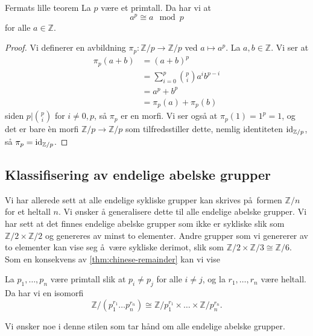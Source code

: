 \begin{corollary}{Fermats lille teorem}
    La $p$ være et primtall.
    Da har vi at
    \[
        a^p \cong a \mod p
    \]
    for alle $a\in \mathbb Z$.
\end{corollary}
\begin{proof}
    Vi definerer en avbildning $\pi_p\colon \mathbb Z / p\to\mathbb Z / p$
    ved $a\mapsto a^p$.
    La $a,b\in \mathbb Z$.
    Vi ser at
    \[\begin{aligned}
        \pi_p(a + b)
        &= (a + b)^p
        \\
        &= \sum_{i = 0}^p \binom p i a^i b^{p - i}
        \\
        &= a^p + b^p
        \\
        &= \pi_p(a) + \pi_p(b)
    \end{aligned}\]
    siden $p|\binom p i$ for $i\neq 0, p$,
    så $\pi_p$ er en morfi.
    Vi ser også at $\pi_p(1) = 1^p = 1$,
    og det er bare \`en morfi $\mathbb Z / p\to \mathbb Z / p$
    som tilfredsstiller dette, nemlig identiteten $\operatorname{id}_{\mathbb Z / p}$,
    så $\pi_p = \operatorname{id}_{\mathbb Z / p}$.
\end{proof}

\subsection{Klassifisering av endelige abelske grupper}
Vi har allerede sett at alle endelige sykliske grupper kan skrives på formen
$\mathbb Z / n$ for et heltall $n$.
Vi ønsker å generalisere dette til alle endelige abelske grupper.
Vi har sett at det finnes endelige abelske grupper som ikke er sykliske
slik som $\mathbb Z / 2\times \mathbb Z / 2$ og genereres av minst to elementer.
Andre grupper som vi genererer av to elementer kan vise seg å være sykliske derimot,
slik som $\mathbb Z / 2\times \mathbb Z / 3 \cong \mathbb Z / 6$.
Som en konsekvens av \cref{thm:chinese-remainder} kan vi vise
\begin{corollary}\label{thm:cyclic-refactoring}
    La $p_1,\dots,p_n$ være primtall slik at $p_i \neq p_j$
    for alle $i\neq j$,
    og la $r_1,\dots,r_n$ være heltall.
    Da har vi en isomorfi
    \[
        \mathbb Z / (p_1^{r_1}\dots p_n^{r_n})
        \cong
        \mathbb Z / p_1^{r_1}\times\dots\times\mathbb Z / p_n^{r_n}.
    \]
\end{corollary}

Vi ønsker noe i denne stilen som tar hånd om alle endelige abelske grupper.

